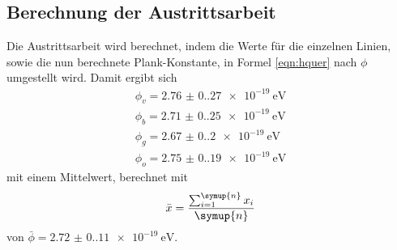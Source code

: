 \subsection{Berechnung der Austrittsarbeit}
Die Austrittsarbeit wird berechnet, indem die Werte für die einzelnen Linien, sowie die nun berechnete Plank-Konstante, in Formel \ref{eqn:hquer} nach $\phi$ umgestellt wird.
Damit ergibt sich 
\begin{gather*}
  \phi_v=\qty{2.76(0.27)e-19}{\electronvolt}\\
  \phi_b=\qty{2.71(0.25)e-19}{\electronvolt}\\
  \phi_g=\qty{2.67(0.20)e-19}{\electronvolt}\\
  \phi_o=\qty{2.75(0.19)e-19}{\electronvolt}
\end{gather*}
mit einem Mittelwert, berechnet mit
\begin{equation}
     \bar{x}=\frac{\sum_{i=1}^{\symup{n}} x_i}{\symup{n}}
     \label{eqn:MW}
\end{equation}
von $\bar{\phi}=\qty{2.72(0.11)e-19}{\electronvolt}$.
